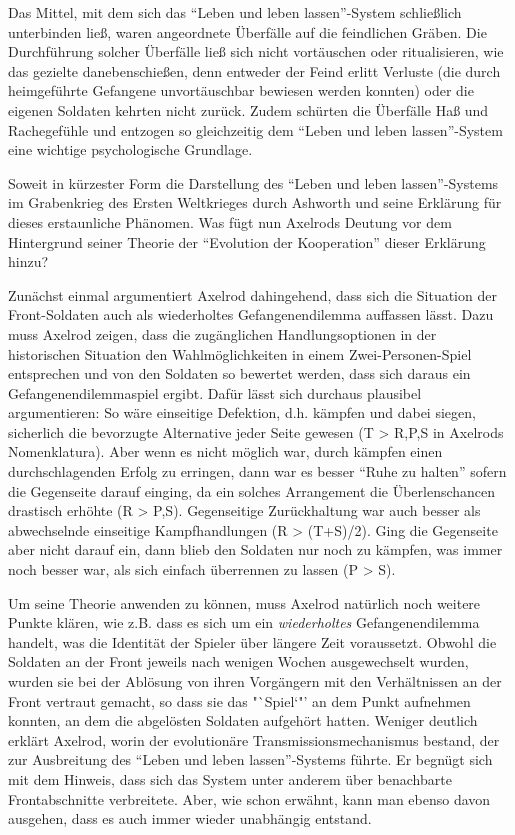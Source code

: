 \documentclass[12pt,a4paper,ngerman]{article}
\begin{document}
Das Mittel, mit dem sich das "`Leben und leben lassen"'-System
schließlich unterbinden ließ, waren angeordnete Überfälle auf die
feindlichen Gräben. Die Durchführung solcher Überfälle ließ sich nicht
vortäuschen oder ritualisieren, wie das gezielte danebenschießen, denn
entweder der Feind erlitt Verluste (die durch heimgeführte Gefangene
unvortäuschbar bewiesen werden konnten) oder die eigenen
Soldaten kehrten nicht zurück. Zudem schürten die Überfälle Haß und
Rachegefühle und entzogen so gleichzeitig dem "`Leben und leben
lassen"'-System eine wichtige psychologische Grundlage\cite[S.
176ff.]{ashworth:1980}.

Soweit in kürzester Form die Darstellung des "`Leben und leben
lassen"'-Systems im Grabenkrieg des Ersten Weltkrieges durch Ashworth
und seine Erklärung für dieses erstaunliche Phänomen. Was fügt nun
Axelrods Deutung vor dem Hintergrund seiner Theorie der "`Evolution
der Kooperation"' dieser Erklärung hinzu?

Zunächst einmal argumentiert Axelrod dahingehend, dass sich die
Situation der Front-Soldaten auch als wiederholtes Gefangenendilemma
auffassen lässt. Dazu muss Axelrod zeigen, dass die zugänglichen
Handlungsoptionen in der historischen Situation den Wahlmöglichkeiten
in einem Zwei-Personen-Spiel entsprechen und von den Soldaten so
bewertet werden, dass sich daraus ein Gefangenendilemmaspiel
ergibt. Dafür lässt sich durchaus plausibel argumentieren: So wäre
einseitige Defektion, d.h. kämpfen und dabei siegen, sicherlich
die bevorzugte Alternative jeder Seite gewesen (T > R,P,S in Axelrods
Nomenklatura). Aber wenn es nicht möglich war, durch kämpfen einen
durchschlagenden Erfolg zu erringen, dann war es besser "`Ruhe zu
halten"' sofern die Gegenseite darauf einging, da ein solches
Arrangement die Überlenschancen drastisch erhöhte (R >
P,S). Gegenseitige Zurückhaltung war auch besser als abwechselnde
einseitige Kampfhandlungen (R > (T+S)/2). Ging die Gegenseite aber
nicht darauf ein, dann blieb den Soldaten nur noch zu kämpfen, was
immer noch besser war, als sich einfach überrennen zu lassen (P > S).

Um seine Theorie anwenden zu können, muss Axelrod natürlich noch
weitere Punkte klären, wie z.B. dass es sich um ein {\em wiederholtes}
Gefangenendilemma handelt, was die Identität der Spieler über längere
Zeit voraussetzt. Obwohl die Soldaten an der Front jeweils nach
wenigen Wochen ausgewechselt wurden, wurden sie bei der Ablösung von
ihren Vorgängern mit den Verhältnissen an der Front vertraut gemacht,
so dass sie das "`Spiel`"' an dem Punkt aufnehmen konnten, an dem die
abgelösten Soldaten aufgehört hatten. Weniger deutlich erklärt
Axelrod, worin der evolutionäre Transmissionsmechanismus bestand, der
zur Ausbreitung des "`Leben und leben lassen"'-Systems führte. Er
begnügt sich mit dem Hinweis, dass sich das System unter anderem über
benachbarte Frontabschnitte verbreitete. Aber, wie schon erwähnt, kann
man ebenso davon ausgehen, dass es auch immer wieder unabhängig
entstand.
\end{document}
